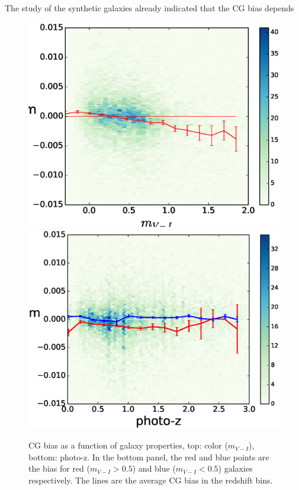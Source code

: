 \documentclass[useAMS,usenatbib]{mnras}
\begin{document}
The study of the synthetic galaxies already indicated that the CG bias depends 


%
\begin{figure}
\includegraphics[width=\hsize]{zheatcolor26.eps}
\includegraphics[width=\hsize]{zphotozheat26.eps}
\caption{CG bias as a function of galaxy properties, top: color
  ($m_{V-I}$), bottom: photo-z. In the bottom panel, the red and blue
  points are the bias for red ($m_{V-I}>0.5$) and blue ($m_{V-I}<0.5$)
  galaxies respectively. The lines are the average CG bias in the
  redshift bins.}
\label{fig:cg2color}
\end{figure}
\end{document}
